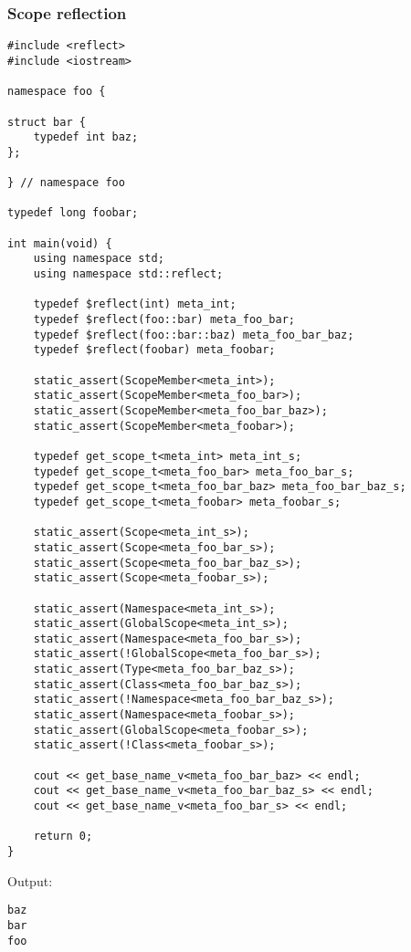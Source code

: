 \subsubsection{Scope reflection}

\begin{verbatim}
#include <reflect>
#include <iostream>

namespace foo {

struct bar {
	typedef int baz;
};

} // namespace foo

typedef long foobar;

int main(void) {
	using namespace std;
	using namespace std::reflect;

	typedef $reflect(int) meta_int;
	typedef $reflect(foo::bar) meta_foo_bar;
	typedef $reflect(foo::bar::baz) meta_foo_bar_baz;
	typedef $reflect(foobar) meta_foobar;

	static_assert(ScopeMember<meta_int>);
	static_assert(ScopeMember<meta_foo_bar>);
	static_assert(ScopeMember<meta_foo_bar_baz>);
	static_assert(ScopeMember<meta_foobar>);

	typedef get_scope_t<meta_int> meta_int_s;
	typedef get_scope_t<meta_foo_bar> meta_foo_bar_s;
	typedef get_scope_t<meta_foo_bar_baz> meta_foo_bar_baz_s;
	typedef get_scope_t<meta_foobar> meta_foobar_s;

	static_assert(Scope<meta_int_s>);
	static_assert(Scope<meta_foo_bar_s>);
	static_assert(Scope<meta_foo_bar_baz_s>);
	static_assert(Scope<meta_foobar_s>);

	static_assert(Namespace<meta_int_s>);
	static_assert(GlobalScope<meta_int_s>);
	static_assert(Namespace<meta_foo_bar_s>);
	static_assert(!GlobalScope<meta_foo_bar_s>);
	static_assert(Type<meta_foo_bar_baz_s>);
	static_assert(Class<meta_foo_bar_baz_s>);
	static_assert(!Namespace<meta_foo_bar_baz_s>);
	static_assert(Namespace<meta_foobar_s>);
	static_assert(GlobalScope<meta_foobar_s>);
	static_assert(!Class<meta_foobar_s>);

	cout << get_base_name_v<meta_foo_bar_baz> << endl;
	cout << get_base_name_v<meta_foo_bar_baz_s> << endl;
	cout << get_base_name_v<meta_foo_bar_s> << endl;

	return 0;
}
\end{verbatim}

Output:

\begin{verbatim}
baz
bar
foo
\end{verbatim}

